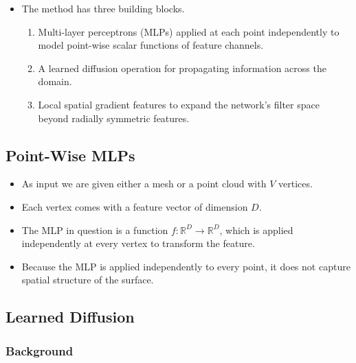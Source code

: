 \documentclass[10pt]{article}
\newcommand{\ra}{\rightarrow}
\newcommand{\Real}{\mathbb{R}}
\begin{document}
\begin{itemize}
  \item The method has three building blocks.
  \begin{enumerate}
    \item Multi-layer perceptrons (MLPs) applied at each point independently to model point-wise scalar functions of feature channels.
    \item A learned diffusion operation for propagating information across the domain.
    \item Local spatial gradient features to expand the network's filter space beyond radially symmetric features.
  \end{enumerate}
\end{itemize}

\subsection{Point-Wise MLPs}

\begin{itemize}
    \item As input we are given either a mesh or a point cloud with $V$ vertices.
    \item Each vertex comes with a feature vector of dimension $D$.
    \item The MLP in question is a function $f: \Real^D \ra \Real^D$, which is applied independently at every vertex to transform the feature.
    \item Because the MLP is applied independently to every point, it does not capture spatial structure of the surface.
\end{itemize}


\subsection{Learned Diffusion}

\subsubsection{Background}
\end{document}
